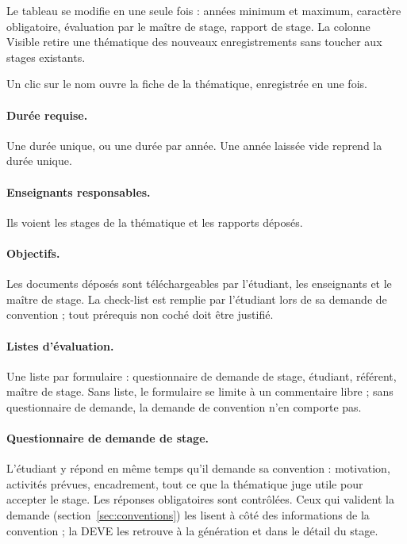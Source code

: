 \documentclass[11pt,a4paper]{article}
\begin{document}
Le tableau se modifie en une seule fois : années minimum et maximum, caractère
obligatoire, évaluation par le maître de stage, rapport de stage. La colonne
\og Visible\fg{} retire une thématique des nouveaux enregistrements sans toucher
aux stages existants.

Un clic sur le nom ouvre la fiche de la thématique, enregistrée en une fois.


\paragraph{Durée requise.} Une durée unique, ou une durée par année. Une année
laissée vide reprend la durée unique.


\paragraph{Enseignants responsables.} Ils voient les stages de la thématique et
les rapports déposés.


\paragraph{Objectifs.} Les documents déposés sont téléchargeables par
l'étudiant, les enseignants et le maître de stage. La check-list est remplie par
l'étudiant lors de sa demande de convention ; tout prérequis non coché doit être
justifié.


\paragraph{Listes d'évaluation.} Une liste par formulaire : questionnaire de
demande de stage, étudiant, référent, maître de stage. Sans liste, le formulaire
se limite à un commentaire libre ; sans questionnaire de demande, la demande de
convention n'en comporte pas.

\paragraph{Questionnaire de demande de stage.} L'étudiant y répond en même temps
qu'il demande sa convention : motivation, activités prévues, encadrement, tout ce
que la thématique juge utile pour accepter le stage. Les réponses obligatoires
sont contrôlées. Ceux qui valident la demande (section~\ref{sec:conventions}) les
lisent à côté des informations de la convention ; la DEVE les retrouve à la
génération et dans le détail du stage.
\end{document}
